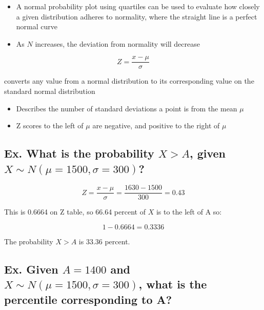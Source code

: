\begin{itemize}
	\item A normal probability plot using quartiles can be used to evaluate how closely a given distribution adheres to normality, where the straight line is a perfect normal curve
	\item As $N$ increases, the deviation from normality will decrease
\end{itemize}

\hformbar




\begin{equation} Z = \frac{x - \mu}{\sigma}\end{equation}

converts any value from a normal distribution to its corresponding value on the standard normal distribution

\begin{itemize}
	\item Describes the number of standard deviations a point is from the mean $\mu$
	\item Z scores to the left of $\mu$ are negative, and positive to the right of $\mu$
\end{itemize}
\hformbar




\subsection*{Ex. What is the probability $X > A$, given $X \sim N(\mu=1500, \sigma=300)$?}

\begin{equation}
	Z = \frac{x - \mu}{\sigma} = \frac{1630 - 1500}{300} = 0.43
\end{equation}

This is 0.6664 on Z table, so 66.64 percent of $X$ is to the left of A so:

\begin{equation}
	1 - 0.6664 = 0.3336
\end{equation}

The probability $X > A$ is 33.36 percent.


\subsection*{Ex. Given $A = 1400$ and $X \sim N(\mu=1500, \sigma=300)$, what is the percentile corresponding to A?}

